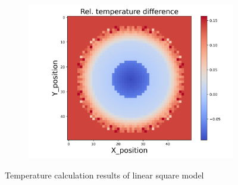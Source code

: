 \begin{figure}[h]
\begin{minipage}{\textwidth}
\begin{subfigure}{0.325\textwidth}
            \centering
            \includegraphics[width=\textwidth]{figures/raw_data/33/lin_square/T_bias.jpg}
        \end{subfigure}
    \end{minipage}
    \caption{Temperature calculation results of linear square model}  
\end{figure}
